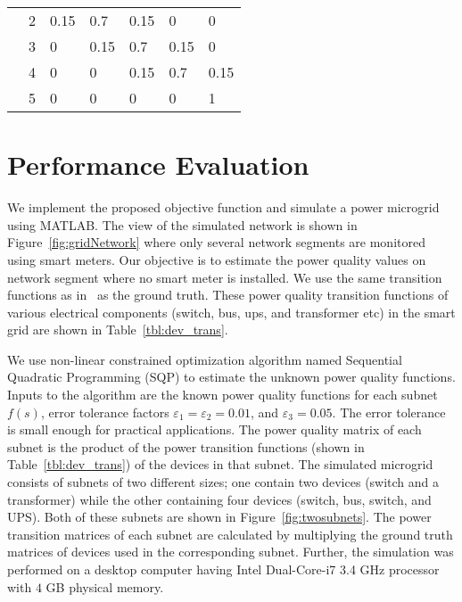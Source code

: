 \begin{table}[!t]
{\begin{tabular}{|cc|lllll|}
& 2 & 0.15	&	0.7	&	0.15	&	0	& 0 \\
& 3 & 0	&	0.15	&	0.7	&	0.15	& 0 \\
& 4 & 0	&	0	&	0.15	&	0.7	& 0.15 \\
& 5 & 0	&	0	&	0	&	0	& 1 \\
\hline
\end{tabular}
}
\end{table}

\section{Performance Evaluation}
\label{sec:evaluation}
We implement the proposed objective function and simulate a power microgrid using MATLAB. The view of the simulated network is shown in Figure~\ref{fig:gridNetwork} where only several network segments are monitored using smart meters. Our objective is to estimate the power quality values on network segment where no smart meter is installed. We use the same transition functions as in~\cite{catherine_pri} as the ground truth. These power quality transition functions of various electrical components (switch, bus, ups, and transformer etc) in the smart grid are shown in Table~\ref{tbl:dev_trans}.

We use non-linear constrained optimization algorithm named Sequential Quadratic Programming (SQP) to estimate the unknown power quality functions. Inputs to the algorithm are the known power quality functions for each subnet $f(s)$, error tolerance factors $\varepsilon_1 = \varepsilon_2 = 0.01$, and $ \varepsilon_3 = 0.05$. The error tolerance is small enough for practical applications. The power quality matrix of each subnet is the product of the power transition functions (shown in Table~\ref{tbl:dev_trans}) of the devices in that subnet. The simulated microgrid consists of subnets of two different sizes; one contain two devices (switch and a transformer) while the other containing four devices (switch, bus, switch, and UPS). Both of these subnets are shown in Figure~\ref{fig:twosubnets}. The power transition matrices of each subnet are calculated by multiplying the ground truth matrices of devices used in the corresponding subnet. Further, the simulation was performed on a desktop computer having Intel Dual-Core-i7 3.4 GHz processor with $4$ GB physical memory.

